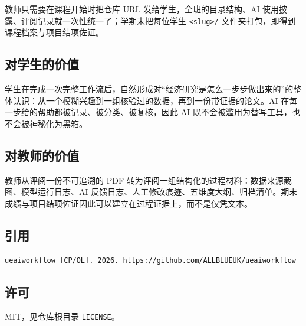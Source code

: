 \documentclass[12pt,a4paper]{article}
\begin{document}
教师只需要在课程开始时把仓库 URL 发给学生，全班的目录结构、AI 使用披露、评阅记录就一次性统一了；学期末把每位学生 \texttt{<slug>/} 文件夹打包，即得到课程档案与项目结项佐证。

\subsection{对学生的价值}

学生在完成一次完整工作流后，自然形成对``经济研究是怎么一步步做出来的''的整体认识：从一个模糊兴趣到一组核验过的数据，再到一份带证据的论文。AI 在每一步给的帮助都被记录、被分类、被复核，因此 AI 既不会被滥用为替写工具，也不会被神秘化为黑箱。

\subsection{对教师的价值}

教师从评阅一份不可追溯的 PDF 转为评阅一组结构化的过程材料：数据来源截图、模型运行日志、AI 反馈日志、人工修改痕迹、五维度大纲、归档清单。期末成绩与项目结项佐证因此可以建立在过程证据上，而不是仅凭文本。

\subsection{引用}

\begin{lstlisting}[style=md]
ueaiworkflow [CP/OL]. 2026. https://github.com/ALLBLUEUK/ueaiworkflow
\end{lstlisting}

\subsection{许可}

MIT，见仓库根目录 \texttt{LICENSE}。
\end{document}
